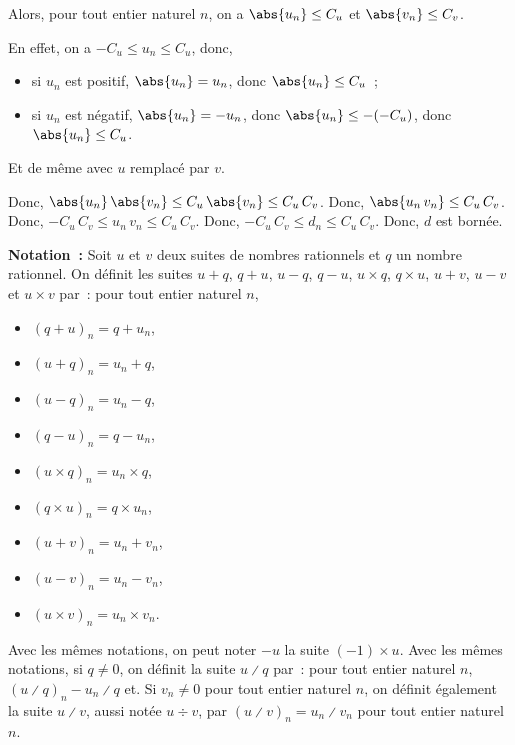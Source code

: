 \begin{itemize}[nosep]
            Alors, pour tout entier naturel $n$, on a $\abs{u_n} \leq C_u$ et $\abs{v_n} \leq C_v$.%
            \begin{foot}
                En effet, on a $-C_u \leq u_n \leq C_u$, donc,
                \begin{itemize}[nosep]
                    \item si $u_n$ est positif, $\abs{u_n} = u_n$, donc $\abs{u_n} \leq C_u$~;
                    \item si $u_n$ est négatif, $\abs{u_n} = -u_n$, donc $\abs{u_n} \leq -(-C_u)$, donc $\abs{u_n} \leq C_u$.
                \end{itemize}
                Et de même avec $u$ remplacé par $v$.
            \end{foot}
            Donc, $\abs{u_n} \, \abs{v_n} \leq C_u \, \abs{v_n} \leq C_u \, C_v$.
            Donc, $\abs{u_n \, v_n} \leq C_u \, C_v$.
            Donc, $-C_u \, C_v \leq u_n \, v_n \leq C_u \, C_v$.
            Donc, $-C_u \, C_v \leq d_n \leq C_u \, C_v$.
            Donc, $d$ est bornée.
    \end{itemize}

    \done

\medskip

\noindent\textbf{Notation :} Soit $u$ et $v$ deux suites de nombres rationnels et $q$ un nombre rationnel.
    On définit les suites $u + q$, $q + u$, $u - q$, $q - u$, $u \times q$, $q \times u$, $u + v$, $u - v$ et $u \times v$ par : pour tout entier naturel $n$, 
    \begin{itemize}[nosep]
        \item $(q + u)_n = q + u_n$,
        \item $(u + q)_n = u_n + q$,
        \item $(u - q)_n = u_n - q$,
        \item $(q - u)_n = q - u_n$,
        \item $(u \times q)_n = u_n \times q$,
        \item $(q \times u)_n = q \times u_n$,
        \item $(u + v)_n = u_n + v_n$,
        \item $(u - v)_n = u_n - v_n$,
        \item $(u \times v)_n = u_n \times v_n$. 
    \end{itemize}
    Avec les mêmes notations, on peut noter $-u$ la suite $(-1) \times u$.
    Avec les mêmes notations, si $q \neq 0$, on définit la suite $u \divslash q$ par : pour tout entier naturel $n$, $(u \divslash q)_n - u_n \divslash q$ et.
    Si $v_n \neq 0$ pour tout entier naturel $n$, on définit également la suite $u \divslash v$, aussi notée $u \div v$, par $\left( u \divslash v \right)_n = u_n \divslash v_n$ pour tout entier naturel $n$.

